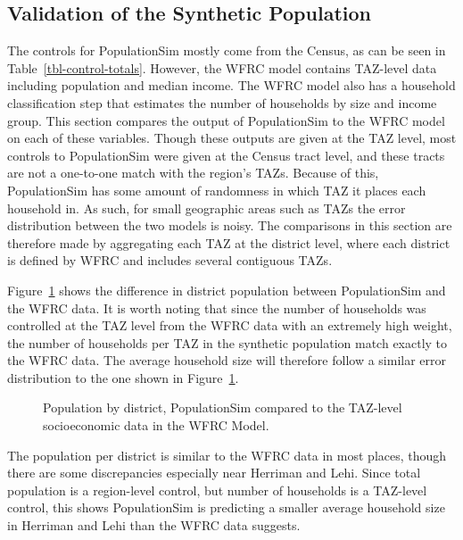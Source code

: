 \documentclass[fancy, oneside, mastersfancy, ms]{byuthesis}
\begin{document}
\subsection{Validation of the Synthetic
Population}\label{validation-of-the-synthetic-population}

The controls for PopulationSim mostly come from the Census, as can be
seen in Table~\ref{tbl-control-totals}. However, the WFRC model contains
TAZ-level data including population and median income. The WFRC model
also has a household classification step that estimates the number of
households by size and income group. This section compares the output of
PopulationSim to the WFRC model on each of these variables. Though these
outputs are given at the TAZ level, most controls to PopulationSim were
given at the Census tract level, and these tracts are not a one-to-one
match with the region's TAZs. Because of this, PopulationSim has some
amount of randomness in which TAZ it places each household in. As such,
for small geographic areas such as TAZs the error distribution between
the two models is noisy. The comparisons in this section are therefore
made by aggregating each TAZ at the district level, where each district
is defined by WFRC and includes several contiguous TAZs.

Figure~\ref{fig-population-comparison} shows the difference in district
population between PopulationSim and the WFRC data. It is worth noting
that since the number of households was controlled at the TAZ level from
the WFRC data with an extremely high weight, the number of households
per TAZ in the synthetic population match exactly to the WFRC data. The
average household size will therefore follow a similar error
distribution to the one shown in Figure~\ref{fig-population-comparison}.

\begin{figure}


\caption{\label{fig-population-comparison}Population by district,
PopulationSim compared to the TAZ-level socioeconomic data in the WFRC
Model.}

\end{figure}%

The population per district is similar to the WFRC data in most places,
though there are some discrepancies especially near Herriman and Lehi.
Since total population is a region-level control, but number of
households is a TAZ-level control, this shows PopulationSim is
predicting a smaller average household size in Herriman and Lehi than
the WFRC data suggests.
\end{document}
